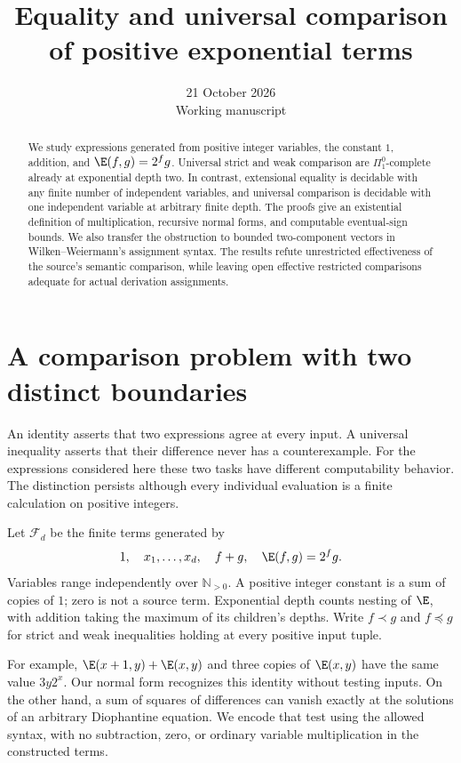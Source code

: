 \documentclass[11pt]{article}
\title{Equality and universal comparison\\of positive exponential terms}
\author{}
\date{21 October 2026\\Working manuscript}
\begin{document}
\maketitle
\begin{abstract}
We study expressions generated from positive integer variables, the constant
$1$, addition, and $\E(f,g)=2^f g$. Universal strict and weak comparison
are $\Pi^0_1$-complete already at exponential depth two. In contrast,
extensional equality is decidable with any finite number of independent
variables, and universal comparison is decidable with one independent
variable at arbitrary finite depth. The proofs give an existential
definition of multiplication, recursive normal forms, and computable
eventual-sign bounds. We also transfer the obstruction to bounded
two-component vectors in Wilken--Weiermann's assignment syntax.
The results refute unrestricted effectiveness of the source's semantic
comparison, while leaving open effective restricted comparisons adequate
for actual derivation assignments.
\end{abstract}

\section{A comparison problem with two distinct boundaries}
An identity asserts that two expressions agree at every input. A
universal inequality asserts that their difference never has a
counterexample. For the expressions considered here these two tasks have
different computability behavior. The distinction persists although every
individual evaluation is a finite calculation on positive integers.

Let $\mathcal F_d$ be the finite terms generated by
\[
  1,\quad x_1,\ldots,x_d,\quad f+g,\quad
  \E(f,g)=2^f g .
\]
Variables range independently over $\mathbb N_{>0}$. A positive integer
constant is a sum of copies of $1$; zero is not a source term.
Exponential depth counts nesting of $\E$, with addition taking the
maximum of its children's depths. Write $f\prec g$ and $f\preceq g$ for
strict and weak inequalities holding at every positive input tuple.

For example, $\E(x+1,y)+\E(x,y)$ and three copies of $\E(x,y)$
have the same value $3y2^x$. Our normal form recognizes this identity
without testing inputs. On the other hand, a sum of squares of
differences can vanish exactly at the solutions of an arbitrary
Diophantine equation. We encode that test using the allowed syntax,
with no subtraction, zero, or ordinary variable multiplication in the
constructed terms.
\end{document}
